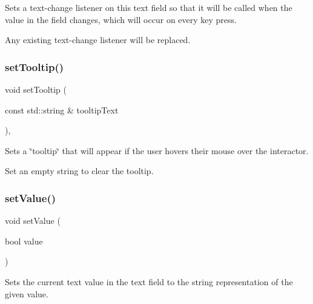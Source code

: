 Sets a text-\/change listener on this text field so that it will be called when the value in the field changes, which will occur on every key press. 

Any existing text-\/change listener will be replaced. \mbox{\label{classsgl_1_1GInteractor_a039e0e49beaecc275efce02d416acea8}} 
\subsubsection{\texorpdfstring{set\+Tooltip()}{setTooltip()}}
{\footnotesize\ttfamily void set\+Tooltip (\begin{DoxyParamCaption}\item[{const std\+::string \&}]{tooltip\+Text }\end{DoxyParamCaption})\hspace{0.3cm}{\ttfamily [virtual]}, {\ttfamily [inherited]}}



Sets a \char`\"{}tooltip\char`\"{} that will appear if the user hovers their mouse over the interactor. 

Set an empty string to clear the tooltip. \mbox{\label{classsgl_1_1GTextField_ae803b3348fa7076308d852bbdeea0d74}} 
\subsubsection{\texorpdfstring{set\+Value()}{setValue()}\hspace{0.1cm}{\footnotesize\ttfamily [1/5]}}
{\footnotesize\ttfamily void set\+Value (\begin{DoxyParamCaption}\item[{bool}]{value }\end{DoxyParamCaption})\hspace{0.3cm}{\ttfamily [virtual]}}



Sets the current text value in the text field to the string representation of the given value. 

\mbox{\label{classsgl_1_1GTextField_aeefe59b3d414b657838869ce084cb0e2}} 
